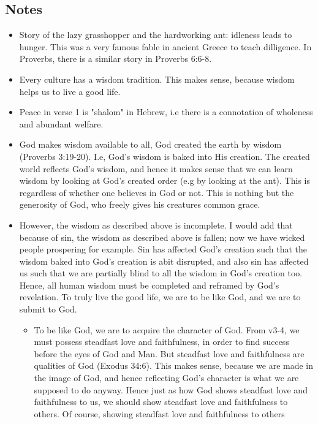 \subsection*{Notes}
\begin{itemize}
  \item{Story of the lazy grasshopper and the hardworking ant: idleness leads
  to hunger.  This was a very famous fable in ancient Greece to teach
  dilligence.  In Proverbs, there is a similar story in Proverbs 6:6-8.}
  \item{Every culture has a wisdom tradition.  This makes sense, because
  wisdom helps us to live a good life.}
  \item{Peace in verse 1 is "shalom" in Hebrew, i.e there is a connotation of
  wholeness and abundant welfare.}
  \item{God makes wisdom available to all, God created the earth by wisdom
  (Proverbs 3:19-20).  I.e, God's wisdom is baked into His creation.  The
  created world reflects God's wisdom, and hence it makes sense that we can
  learn wisdom by looking at God's created order (e.g by looking at the ant).
  This is regardless of whether one believes in God or not.  This is nothing
  but the generosity of God, who freely gives his creatures common grace.}
  \item{However, the wisdom as described above is incomplete.  I would add
  that because of sin, the wisdom as described above is fallen; now we have
  wicked people prospering for example.  Sin has affected God's creation such
  that the wisdom baked into God's creation is abit disrupted, and also sin
  has affected us such that we are partially blind to all the wisdom in God's
  creation too.  Hence, all human wisdom must be completed and reframed by
  God's revelation.  To truly live the good life, we are to be like God, and
  we are to submit to God.
  \begin{itemize}
    \item{To be like God, we are to acquire the character of God.  From v3-4,
    we must possess steadfast love and faithfulness, in order to find success
    before the eyes of God and Man.  But steadfast love and faithfulness are
    qualities of God (Exodus 34:6).  This makes sense, because we are made in
    the image of God, and hence reflecting God's character is what we are
    supposed to do anyway.  Hence just as how God shows steadfast love and
    faithfulness to us, we should show steadfast love and faithfulness to
    others.  Of course, showing steadfast love and faithfulness to others
}
\end{itemize}}
\end{itemize}
